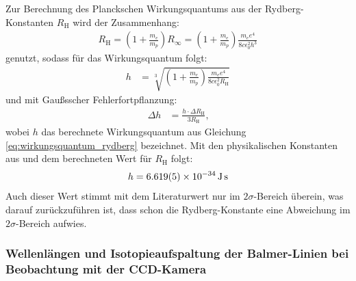 \documentclass[11pt, a4paper]{article}
\numberwithin{equation}{section}
\begin{document}
Zur Berechnung des Planckschen Wirkungsquantums aus der Rydberg-Konstanten $R_\mathrm{H}$ wird der Zusammenhang:
\begin{align*}
	R_\mathrm{H} = \left( 1 + \frac{m_e}{m_p} \right) R_\infty = \left( 1 + \frac{m_e}{m_p} \right) \frac{m_e e^4}{8 c \epsilon_0^2 h^3}
\end{align*}
genutzt, sodass für das Wirkungsquantum folgt:
\begin{align}
	\label{eq:wirkungsquantum_rydberg}
	h &= \sqrt[3]{\left( 1 + \frac{m_e}{m_p} \right) \frac{m_e e^4}{8 c \epsilon_0^2 R_\mathrm{H}}}
\end{align}
und mit Gaußsscher Fehlerfortpflanzung:
\begin{align*}
	\Delta h &= \frac{h \cdot \Delta R_\mathrm{H}}{3 R_\mathrm{H}} \text{,}
\end{align*}
wobei $h$ das berechnete Wirkungsquantum aus Gleichung \ref{eq:wirkungsquantum_rydberg} bezeichnet.
Mit den physikalischen Konstanten aus \cite{CODATA} und dem berechneten Wert für $R_\mathrm{H}$ folgt:
\begin{align*}
	h = \SI{6.619 +- 0.005e-34}{\joule\second}
\end{align*}
Auch dieser Wert stimmt mit dem Literaturwert nur im $2\sigma$-Bereich überein, was darauf zurückzuführen ist, dass schon die Rydberg-Konstante eine Abweichung im $2\sigma$-Bereich aufwies.

\subsubsection{Wellenlängen und Isotopieaufspaltung der Balmer-Linien bei Beobachtung mit der CCD-Kamera}
\end{document}
